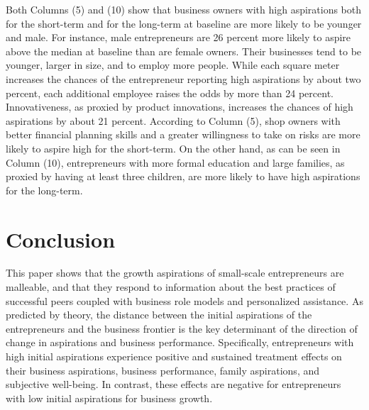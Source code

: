 \documentclass[11.5pt]{article}
\begin{document}
Both Columns (5) and (10) show that business owners with high aspirations both for the short-term and for the long-term at baseline are more likely to be younger and male. For instance, male entrepreneurs are 26 percent more likely to aspire above the median at baseline than are female owners. Their businesses tend to be younger, larger in size, and to employ more people. While each square meter increases the chances of the entrepreneur reporting high aspirations by about two percent, each additional employee raises the odds by more than 24 percent. Innovativeness, as proxied by product innovations, increases the chances of high aspirations by about 21 percent. According to Column (5), shop owners with better financial planning skills and a greater willingness to take on risks are more likely to aspire high for the short-term. On the other hand, as can be seen in Column (10), entrepreneurs with more formal education and large families, as proxied by having at least three children, are more likely to have high aspirations for the long-term.



\section{Conclusion}\label{sec.conc}

This paper shows that the growth aspirations of small-scale entrepreneurs are malleable, and that they respond to information about the best practices of successful peers coupled with business role models and personalized assistance. As predicted by theory, the distance between the initial aspirations of the entrepreneurs and the business frontier is the key determinant of the direction of change in aspirations and business performance. Specifically, entrepreneurs with high initial aspirations experience positive and sustained treatment effects on their business aspirations, business performance, family aspirations, and subjective well-being. In contrast, these effects are negative for entrepreneurs with low initial aspirations for business growth. %
\end{document}
